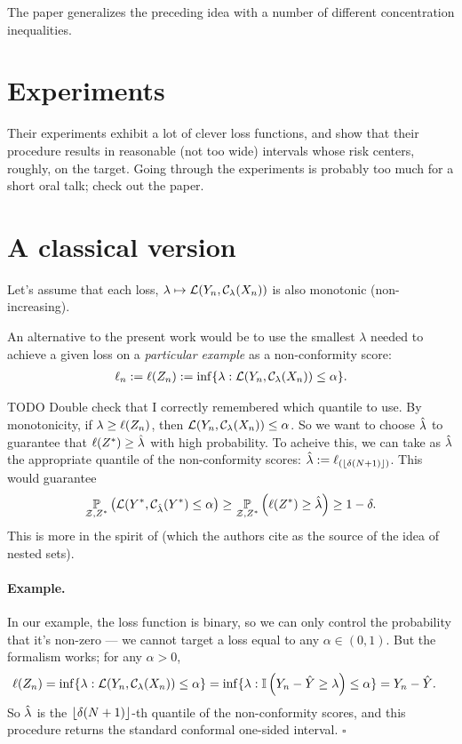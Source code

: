 \documentclass[twoside,11pt]{article}
\numberwithin{equation}{section}
\begin{document}
The paper generalizes the preceding idea with a number of different
concentration inequalities.






\section{Experiments}

Their experiments exhibit a lot of clever loss functions, and show that
their procedure results in reasonable (not too wide) intervals whose
risk centers, roughly, on the target.  Going through the experiments
is probably too much for a short oral talk; check out the paper.



\section{A classical version}

Let's assume that each loss, $\lambda \mapsto \mathcal{L}(Y_n, \mathcal{C}_\lambda(X_n))$
is also monotonic (non-increasing).

An alternative to the present work would be to use the smallest $\lambda$ needed
to achieve a given loss on a \textit{particular example} as a non-conformity
score:
%
\begin{align*}
%
\ell_n := \ell(\z_n) := \inf \{ \lambda: \loss(\y_n, \cfun_\lambda(\x_n)) \le \alpha \}.
%
\end{align*}

TODO Double check that I correctly remembered which quantile to use.
By monotonicity, if $\lambda \ge \ell(Z_n)$, then $\mathcal{L}(Y_n,
\mathcal{C}_\lambda(X_n)) \le \alpha$.  So we want to choose $\hat{\lambda}$ to
guarantee that $\ell(Z^{*}) \ge \hat{\lambda}$ with high probability. To acheive
this, we can take as $\hat{\lambda}$ the appropriate quantile of the non-conformity
scores: $\hat{\lambda} := \ell_{(\lfloor \delta (N + 1) \rfloor)}$. This would
guarantee
%
\begin{align*}
%
\p{\calset,\znew}{\loss(\ynew, \cfun_{\lambdahat} (\ynew) \le \alpha}
\ge
\p{\calset,\znew}{\ell(\znew) \ge \lambdahat}
\ge 1 - \delta.
%
\end{align*}
%
This is more in the spirit of \citet{gupta:2022:nestedconformal} (which the
authors cite as the source of the idea of nested sets).

\paragraph{Example. } In our example, the loss function is binary,
so we can only control the probability that it's non-zero
--- we cannot target a loss equal to any $\alpha \in (0, 1)$.
But the formalism works; for any $\alpha > 0$,
%
\begin{align*}
%
\ell(\z_n) =
\inf \{ \lambda: \loss(\y_n, \cfun_\lambda(\x_n)) \le \alpha \} &=
\inf \{ \lambda: \ind{\y_n - \yhat \ge \lambda} \le \alpha \} = \y_n - \yhat.
\end{align*}
%
So $\hat{\lambda}$ is the $\lfloor \delta (N + 1) \rfloor$-th quantile of the
non-conformity scores, and this procedure returns the standard conformal
one-sided interval. $\square$
\end{document}
